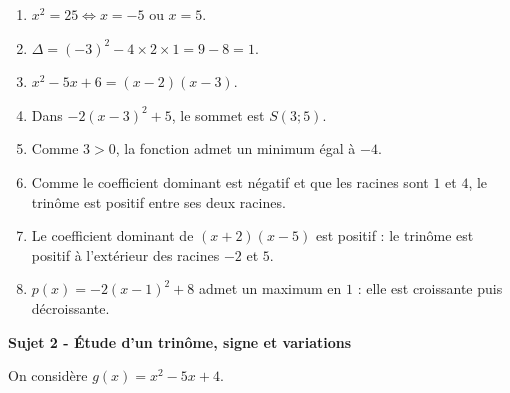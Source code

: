 \documentclass[10pt,a4paper]{article}
\newcommand{\sujet}[1]{\vspace{0.45em}\noindent\textbf{#1}\par\vspace{0.2em}}
\begin{document}
\begin{enumerate}[leftmargin=*, itemsep=0.35em]
\item $x^2=25 \Longleftrightarrow x=-5$ ou $x=5$.
\item $\Delta=(-3)^2-4\times 2\times 1=9-8=1$.
\item $x^2-5x+6=(x-2)(x-3)$.
\item Dans $-2(x-3)^2+5$, le sommet est $S(3;5)$.
\item Comme $3>0$, la fonction admet un minimum égal à $-4$.
\item Comme le coefficient dominant est négatif et que les racines sont $1$ et $4$, le trinôme est positif entre ses deux racines.
\item Le coefficient dominant de $(x+2)(x-5)$ est positif : le trinôme est positif à l'extérieur des racines $-2$ et $5$.
\item $p(x)=-2(x-1)^2+8$ admet un maximum en $1$ : elle est croissante puis décroissante.
\end{enumerate}

\sujet{Sujet 2 - Étude d'un trinôme, signe et variations}
On considère $g(x)=x^2-5x+4$.
\end{document}
